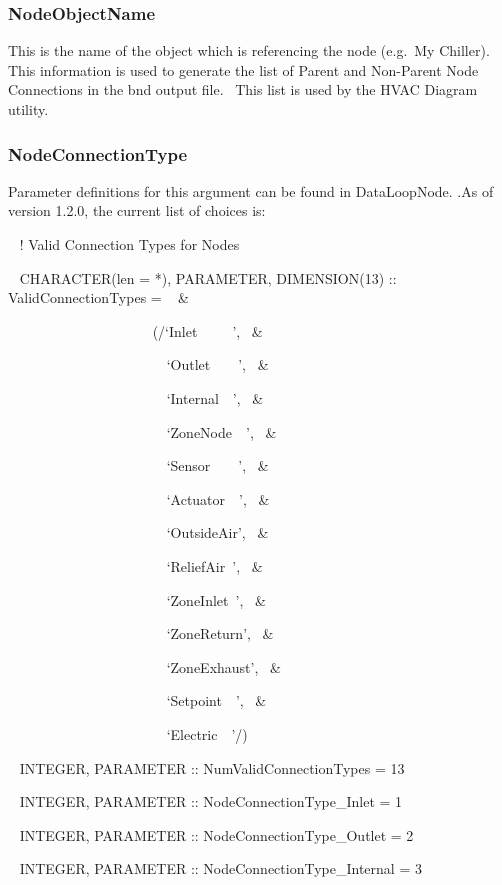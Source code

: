\subsubsection{NodeObjectName}\label{nodeobjectname}

This is the name of the object which is referencing the node (e.g.~My Chiller).~ This information is used to generate the list of Parent and Non-Parent Node Connections in the bnd output file.~ This list is used by the HVAC Diagram utility.

\subsubsection{NodeConnectionType}\label{nodeconnectiontype}

Parameter definitions for this argument can be found in DataLoopNode. .As of version 1.2.0, the current list of choices is:

~ ! Valid Connection Types for Nodes

~ CHARACTER(len = *), PARAMETER, DIMENSION(13) :: ValidConnectionTypes = ~ \&

~~~~~~~~~~~~~~~~~~~~ (/`Inlet~~~~~',~ \&

~~~~~~~~~~~~~~~~~~~~~~ `Outlet~~~~',~ \&

~~~~~~~~~~~~~~~~~~~~~~ `Internal~~',~ \&

~~~~~~~~~~~~~~~~~~~~~~ `ZoneNode~~',~ \&

~~~~~~~~~~~~~~~~~~~~~~ `Sensor~~~~',~ \&

~~~~~~~~~~~~~~~~~~~~~~ `Actuator~~',~ \&

~~~~~~~~~~~~~~~~~~~~~~ `OutsideAir',~ \&

~~~~~~~~~~~~~~~~~~~~~~ `ReliefAir~',~ \&

~~~~~~~~~~~~~~~~~~~~~~ `ZoneInlet~',~ \&

~~~~~~~~~~~~~~~~~~~~~~ `ZoneReturn',~ \&

~~~~~~~~~~~~~~~~~~~~~~ `ZoneExhaust',~ \&

~~~~~~~~~ ~~~~~~~~~~~~~`Setpoint~~',~ \&

~~~~~~~~~~~~~~~~~~~~~~ `Electric~~'/)

~ INTEGER, PARAMETER :: NumValidConnectionTypes = 13

~ INTEGER, PARAMETER :: NodeConnectionType\_Inlet = 1

~ INTEGER, PARAMETER :: NodeConnectionType\_Outlet = 2

~ INTEGER, PARAMETER :: NodeConnectionType\_Internal = 3

